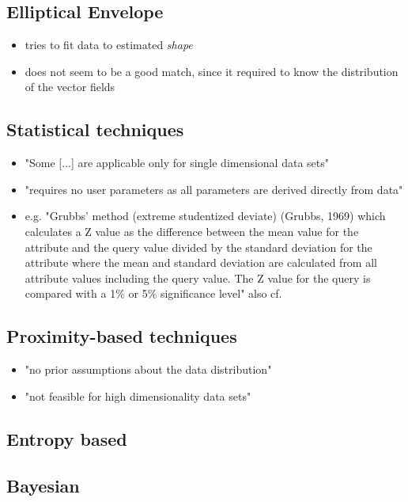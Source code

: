	\subsection{Elliptical Envelope}
	\begin{itemize}
		\item tries to fit data to estimated \emph{shape}
		\item does not seem to be a good match, since it required to know the distribution of the vector fields
	\end{itemize}

	\subsection{Statistical techniques}
	\begin{itemize}
		\item "Some [...] are applicable only for single dimensional data sets" \parencite{Hodge2004}
		\item "requires no user parameters as all parameters are derived directly from data" \parencite{Hodge2004}
		\item e.g. "Grubbs’ method (extreme studentized deviate) (Grubbs, 1969) which calculates a Z value as the difference between the mean value for the attribute and the query value divided by the standard deviation for the attribute where the mean and standard deviation are calculated from all attribute values including the query value. The Z value for the query is compared with a 1\% or 5\% significance level" \parencite{Hodge2004} also cf. \textcite{Grubbs1969}
	\end{itemize}

	\subsection{Proximity-based techniques}
	\begin{itemize}
		\item "no prior assumptions about the data distribution" \parencite{Hodge2004}
		\item "not feasible for high dimensionality data sets" \parencite{Hodge2004}
		
	\end{itemize}

	\subsection{Entropy based}
	\subsection{Bayesian}
